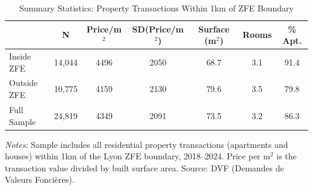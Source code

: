 \begin{table}[htbp]
\centering
\caption{Summary Statistics: Property Transactions Within 1km of ZFE Boundary}
\label{tab:summary}
\begin{tabular}{lcccccc}
\toprule
 & N & Price/m$^2$ & SD(Price/m$^2$) & Surface (m$^2$) & Rooms & \% Apt. \\
\midrule
Inside ZFE & 14,044 & 4496 & 2050 & 68.7 & 3.1 & 91.4 \\
Outside ZFE & 10,775 & 4159 & 2130 & 79.6 & 3.5 & 79.8 \\
\midrule
Full Sample & 24,819 & 4349 & 2091 & 73.5 & 3.2 & 86.3 \\
\bottomrule
\end{tabular}
\begin{tablenotes}[flushleft]\small
\item \textit{Notes:} Sample includes all residential property transactions (apartments and houses) within 1km of the Lyon ZFE boundary, 2018--2024. Price per m$^2$ is the transaction value divided by built surface area. Source: DVF (Demandes de Valeurs Fonci\`eres).
\end{tablenotes}
\end{table}

